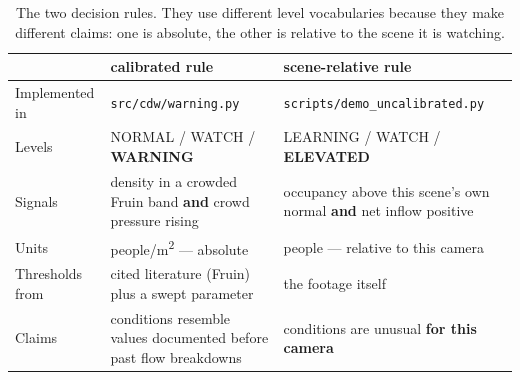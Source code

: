 \begin{table}[t]
  \centering
  \caption{The two decision rules. They use different level vocabularies
           because they make different claims: one is absolute, the other is
           relative to the scene it is watching.}
  \label{tab:decision-rules}
  \begin{tabularx}{\linewidth}{@{}L{0.65}L{1.20}L{1.15}@{}}
    \toprule
      & \textbf{calibrated rule} & \textbf{scene-relative rule} \\
    \midrule
    Implemented in
      & \texttt{src/cdw/warning.py}
      & \texttt{scripts/demo\_uncalibrated.py} \\
    Levels
      & NORMAL / WATCH / \textbf{WARNING}
      & LEARNING / WATCH / \textbf{ELEVATED} \\
    Signals
      & density in a crowded Fruin band \textbf{and} crowd pressure rising
      & occupancy above this scene's own normal \textbf{and} net inflow
        positive \\
    Units
      & people/m\textsuperscript{2} --- absolute
      & people --- relative to this camera \\
    Thresholds from
      & cited literature (Fruin) plus a swept parameter
      & the footage itself \\
    Claims
      & conditions resemble values documented before past flow breakdowns
      & conditions are unusual \textbf{for this camera} \\
    \bottomrule
  \end{tabularx}
\end{table}
